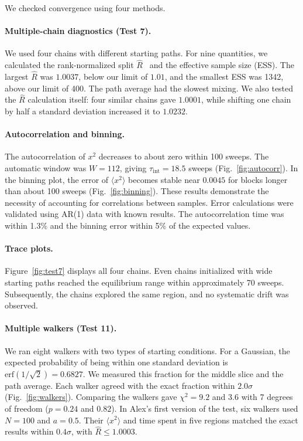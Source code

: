 \documentclass[11pt]{article}
\begin{document}
We checked convergence using four methods.

\paragraph{Multiple-chain diagnostics (Test 7).} We used four chains with
different starting paths. For nine quantities, we calculated the
rank-normalized split $\hat R$~\cite{vehtari, gelman} and the effective sample
size (ESS). The largest $\hat R$ was $1.0037$, below our limit of $1.01$, and
the smallest ESS was 1342, above our limit of 400. The path average had the
slowest mixing. We also tested the $\hat R$ calculation itself: four similar
chains gave $1.0001$, while shifting one chain by half a standard deviation
increased it to $1.0232$.

\paragraph{Autocorrelation and binning.} The autocorrelation of $x^2$
decreases to about zero within 100 sweeps. The automatic window was $W = 112$,
giving $\tau_{\mathrm{int}} = 18.5$ sweeps (Fig.~\ref{fig:autocorr}). In the
binning plot, the error of $\langle x^2\rangle$ becomes stable near $0.0045$
for blocks longer than about 100 sweeps (Fig.~\ref{fig:binning}). These results
demonstrate the necessity of accounting for correlations between samples.
Error calculations were validated using AR(1) data with known results. The
autocorrelation time was within 1.3\% and the binning error within 5\% of the
expected values.

\paragraph{Trace plots.} Figure~\ref{fig:test7} displays all four chains. Even
chains initialized with wide starting paths reached the equilibrium range
within approximately 70 sweeps. Subsequently, the chains explored the same
region, and no systematic drift was observed.

\paragraph{Multiple walkers (Test 11).} We ran eight walkers with two types of
starting conditions. For a Gaussian, the expected probability of being within
one standard deviation is $\mathrm{erf}(1/\sqrt2) = 0.6827$. We measured this
fraction for the middle slice and the path average. Each walker agreed with the
exact fraction within $2.0\sigma$ (Fig.~\ref{fig:walkers}). Comparing the
walkers gave $\chi^2 = 9.2$ and $3.6$ with 7 degrees of freedom ($p = 0.24$ and
$0.82$). In Alex's first version of the test, six walkers used $N = 100$
and $a = 0.5$. Their $\langle x^2\rangle$ and time spent in five regions
matched the exact results within $0.4\sigma$, with $\hat R \le 1.0003$.
\end{document}
